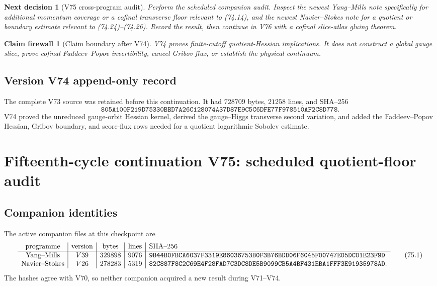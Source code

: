\documentclass[11pt]{article}
\newtheorem{firewall}[theorem]{Claim firewall}
\newtheorem{decision}[theorem]{Next decision}
\theoremstyle{remark}
\begin{document}
\begin{decision}[V75 cross-program audit]
\label{dec:v15v74-next}
Perform the scheduled companion audit.  Inspect the newest
Yang--Mills note specifically for additional momentum coverage or
a cofinal transverse floor relevant to (74.14), and the newest
Navier--Stokes note for a quotient or boundary estimate relevant
to (74.24)--(74.26).  Record the result, then continue in V76 with
a cofinal slice-atlas gluing theorem.
\end{decision}

\begin{firewall}[Claim boundary after V74]
\label{fire:v15v74}
V74 proves finite-cutoff quotient-Hessian implications.  It does
not construct a global gauge slice, prove cofinal Faddeev--Popov
invertibility, cancel Gribov flux, or establish the physical
continuum.
\end{firewall}

\section*{Version V74 append-only record}
The complete V73 source was retained before this continuation.  It
had \(728709\) bytes, \(21258\) lines, and SHA--256
\[
 \texttt{805A100F219D75330BBD7A26C128074A37D87E9C5C6DFE77F978510AF2C8D778}.
\]
V74 proved the unreduced gauge-orbit Hessian kernel, derived the
gauge--Higgs transverse second variation, and added the
Faddeev--Popov Hessian, Gribov boundary, and score-flux rows needed
for a quotient logarithmic Sobolev estimate.


\chapter{Fifteenth-cycle continuation V75: scheduled quotient-floor audit}
\label{sec:v15v75}

\section{Companion identities}

The active companion files at this checkpoint are
\[
\begin{array}{c|c|c|c|l}
\hbox{programme}&\hbox{version}&\hbox{bytes}&\hbox{lines}&\hbox{SHA--256}\\ \hline
\hbox{Yang--Mills}&V39&329898&9076&
\texttt{9B44B0FBCA6037F3319E86036753B0F3B76BDD06F6045F00747E05DC01E23F9D}\\
\hbox{Navier--Stokes}&V26&278283&5319&
\texttt{82C887F8C2C69E4F28FAD7C3DC8DE5B9099CB5A4BF431EBA1FFF3E91935978AD}.
\end{array}                                             \tag{75.1}
\]
The hashes agree with V70, so neither companion acquired a new
result during V71--V74.
\end{document}

